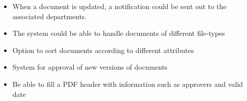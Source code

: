 \begin{itemize}
\item
When a document is updated, a notification could be sent out to the associated departments.
\item
The system could be able to handle documents of different file-types
\item
Option to sort documents according to different attributes
\item
System for approval of new versions of documents
\item
Be able to fill a PDF header with information such as approvers and valid date
\end{itemize}

